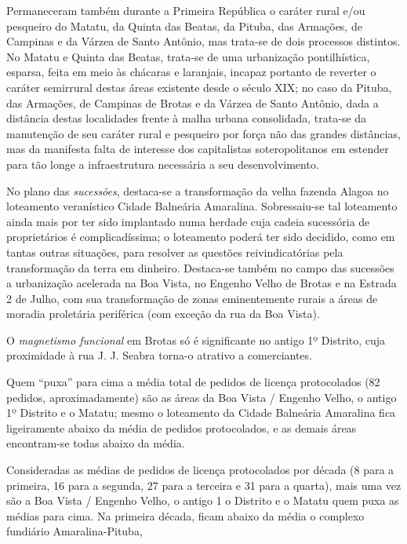 Permaneceram também durante a Primeira República o caráter rural e/ou pesqueiro do Matatu, da Quinta das Beatas, da Pituba, das Armações, de Campinas e da Várzea de Santo Antônio, mas trata-se de dois processos distintos. No Matatu e Quinta das Beatas, trata-se de uma urbanização pontilhística, esparsa, feita em meio às chácaras e laranjais, incapaz portanto de reverter o caráter semirrural destas áreas existente desde o século XIX; no caso da Pituba, das Armações, de Campinas de Brotas e da Várzea de Santo Antônio, dada a distância destas localidades frente à malha urbana consolidada, trata-se da manutenção de seu caráter rural e pesqueiro por força não das grandes distâncias, mas da manifesta falta de interesse dos capitalistas soteropolitanos em estender para tão longe a infraestrutura necessária a seu desenvolvimento.

No plano das \textit{sucessões}, destaca-se a transformação da velha fazenda Alagoa no loteamento veranístico Cidade Balneária Amaralina. Sobressaiu-se tal loteamento ainda mais por ter sido implantado numa herdade cuja cadeia sucessória de proprietários é complicadíssima; o loteamento poderá ter sido decidido, como em tantas outras situações, para resolver as questões reivindicatórias pela transformação da terra em dinheiro. Destaca-se também no campo das sucessões a urbanização acelerada na Boa Vista, no Engenho Velho de Brotas e na Estrada 2 de Julho, com sua transformação de zonas eminentemente rurais a áreas de moradia proletária periférica (com exceção da rua da Boa Vista). 

O \textit{magnetismo funcional} em Brotas só é significante no antigo 1º Distrito, cuja proximidade à rua J. J. Seabra torna-o atrativo a comerciantes.

Quem ``puxa'' para cima a média total de pedidos de licença protocolados (82 pedidos, aproximadamente) são as áreas da Boa Vista / Engenho Velho, o antigo 1º Distrito e o Matatu; mesmo o loteamento da Cidade Balneária Amaralina fica ligeiramente abaixo da média de pedidos protocolados, e as demais áreas encontram-se todas abaixo da média.

Consideradas as médias de pedidos de licença protocolados por década (8 para a primeira, 16 para a segunda, 27 para a terceira e 31 para a quarta), mais uma vez são a Boa Vista / Engenho Velho, o antigo 1 o Distrito e o Matatu quem puxa as médias para cima. Na primeira década, ficam abaixo da média o complexo fundiário Amaralina-Pituba, 

